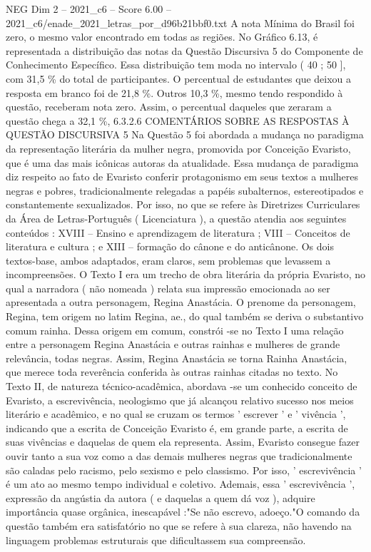 \begin{textsample}{NEG Dim 2 – 2021\_c6 – Score 6.00 – 2021\_c6/enade\_2021\_letras\_por\_d96b21bbf0.txt}
A nota Mínima do Brasil foi zero, o mesmo valor encontrado em todas as regiões.
No Gráfico 6.13, é representada a distribuição das notas da Questão Discursiva 5 do Componente de Conhecimento Específico.
Essa distribuição tem moda no intervalo ( 40 ; 50 ], com 31,5 \% do total de participantes.
O percentual de estudantes que deixou a resposta em branco foi de 21,8 \%.
Outros 10,3 \%, mesmo tendo respondido à questão, receberam nota zero.
Assim, o percentual daqueles que zeraram a questão chega a 32,1 \%, 6.3.2.6 COMENTÁRIOS SOBRE AS RESPOSTAS À QUESTÃO DISCURSIVA 5 Na Questão 5 foi abordada a mudança no paradigma da representação literária da mulher negra, promovida por Conceição Evaristo, que é uma das mais icônicas autoras da atualidade.
Essa mudança de paradigma diz respeito ao fato de Evaristo conferir protagonismo em seus textos a mulheres negras e pobres, tradicionalmente relegadas a papéis subalternos, estereotipados e constantemente sexualizados.
Por isso, no que se refere às Diretrizes Curriculares da Área de Letras-Português ( Licenciatura ), a questão atendia aos seguintes conteúdos : XVIII – Ensino e aprendizagem de literatura ; VIII – Conceitos de literatura e cultura ; e XIII – formação do cânone e do anticânone.
Os dois textos-base, ambos adaptados, eram claros, sem problemas que levassem a incompreensões.
O Texto I era um trecho de obra literária da própria Evaristo, no qual a narradora ( não nomeada ) relata sua impressão emocionada ao ser apresentada a outra personagem, Regina Anastácia.
O prenome da personagem, Regina, tem origem no latim Regina, ae., do qual também se deriva o substantivo comum rainha.
Dessa origem em comum, constrói -se no Texto I uma relação entre a personagem Regina Anastácia e outras rainhas e mulheres de grande relevância, todas negras.
Assim, Regina Anastácia se torna Rainha Anastácia, que merece toda reverência conferida às outras rainhas citadas no texto.
No Texto II, de natureza técnico-acadêmica, abordava -se um conhecido conceito de Evaristo, a escrevivência, neologismo que já alcançou relativo sucesso nos meios literário e acadêmico, e no qual se cruzam os termos ' escrever ' e ' vivência ', indicando que a escrita de Conceição Evaristo é, em grande parte, a escrita de suas vivências e daquelas de quem ela representa.
Assim, Evaristo consegue fazer ouvir tanto a sua voz como a das demais mulheres negras que tradicionalmente são caladas pelo racismo, pelo sexismo e pelo classismo.
Por isso, ' escrevivência ' é um ato ao mesmo tempo individual e coletivo.
Ademais, essa ' escrevivência ', expressão da angústia da autora ( e daquelas a quem dá voz ), adquire importância quase orgânica, inescapável :"Se não escrevo, adoeço."O comando da questão também era satisfatório no que se refere à sua clareza, não havendo na linguagem problemas estruturais que dificultassem sua compreensão.

\end{textsample}
